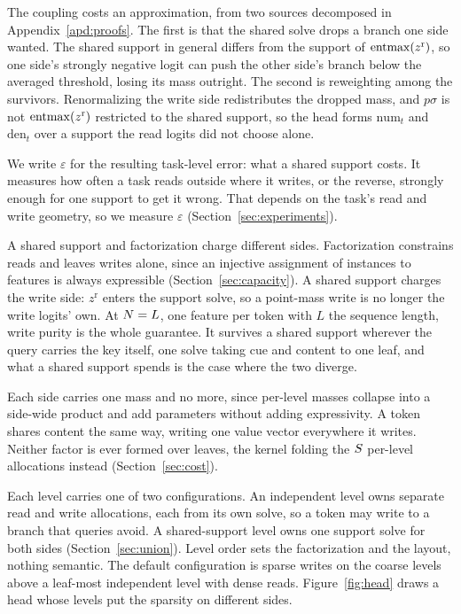 The coupling costs an approximation, from two sources decomposed in Appendix~\ref{apd:proofs}. The first is that the shared solve drops a branch one side wanted. The shared support in general differs from the support of $\mathrm{entmax}(z^{\mathrm{r}})$, so one side's strongly negative logit can push the other side's branch below the averaged threshold, losing its mass outright. The second is reweighting among the survivors. Renormalizing the write side redistributes the dropped mass, and $p \sigma$ is not $\mathrm{entmax}(z^{\mathrm{r}})$ restricted to the shared support, so the head forms $\mathrm{num}_t$ and $\mathrm{den}_t$ over a support the read logits did not choose alone.

We write $\varepsilon$ for the resulting task-level error: what a shared support costs. It measures how often a task reads outside where it writes, or the reverse, strongly enough for one support to get it wrong. That depends on the task's read and write geometry, so we measure $\varepsilon$ (Section~\ref{sec:experiments}).

A shared support and factorization charge different sides. Factorization constrains reads and leaves writes alone, since an injective assignment of instances to features is always expressible (Section~\ref{sec:capacity}). A shared support charges the write side: $z^{\mathrm{r}}$ enters the support solve, so a point-mass write is no longer the write logits' own. At $N = L$, one feature per token with $L$ the sequence length, write purity is the whole guarantee. It survives a shared support wherever the query carries the key itself, one solve taking cue and content to one leaf, and what a shared support spends is the case where the two diverge.

Each side carries one mass and no more, since per-level masses collapse into a side-wide product and add parameters without adding expressivity. A token shares content the same way, writing one value vector everywhere it writes. Neither factor is ever formed over leaves, the kernel folding the $S$ per-level allocations instead (Section~\ref{sec:cost}).

Each level carries one of two configurations. An independent level owns separate read and write allocations, each from its own solve, so a token may write to a branch that queries avoid. A shared-support level owns one support solve for both sides (Section~\ref{sec:union}). Level order sets the factorization and the layout, nothing semantic. The default configuration is sparse writes on the coarse levels above a leaf-most independent level with dense reads. Figure~\ref{fig:head} draws a head whose levels put the sparsity on different sides.

